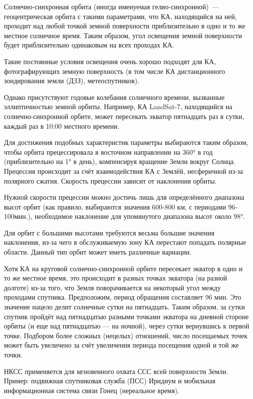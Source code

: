 \documentclass[14pt,a4paper,oneside]{extarticle}
\begin{document}
Солнечно-синхронная орбита (иногда именуемая гелио-синхронной) — геоцентрическая орбита с такими параметрами, что КА, находящийся на ней, проходит над любой точкой земной поверхности приблизительно в одно и то же местное солнечное время. Таким образом, угол освещения земной поверхности будет приблизительно одинаковым на всех проходах КА.

Такие постоянные условия освещения очень хорошо подходят для КА, фотографирующих земную поверхность (в том числе КА дистанционного зондирования земли (ДЗЗ), метеоспутников). 

Однако присутствуют годовые колебания солнечного времени, вызванные эллиптичностью земной орбиты. Например, КА LandSat-7, находящийся на солнечно-синхронной орбите, может пересекать экватор пятнадцать раз в сутки, каждый раз в 10:00 местного времени.

Для достижения подобных характеристик параметры выбираются таким образом, чтобы орбита прецессировала в восточном направлении на 360° в год (приблизительно на 1° в день), компенсируя вращение Земли вокруг Солнца. Прецессия происходит за счёт взаимодействия КА с Землёй, несферичной из-за полярного сжатия. Скорость прецессии зависит от наклонения орбиты.

Нужной скорости прецессии можно достичь лишь для определённого диапазона высот орбит (как правило, выбираются значения 600-800 км, с периодами 96-100мин.), необходимое наклонение для упомянутого диапазона высот около 98°.

Для орбит с большими высотами требуются весьма большие значения наклонения, из-за чего в обслуживаемую зону КА перестают попадать полярные области. Данный тип орбит может иметь различные вариации.

Хотя КА на круговой солнечно-синхронной орбите пересекает экватор в одно и то же местное время, это происходит в разных точках экватора (на разной долготе) из-за того, что Земля поворачивается на некоторый угол между проходами спутника. Предположим, период обращения составляет 96 мин. Это значение нацело делит солнечные сутки на пятнадцать. Таким образом, за сутки спутник пройдёт над пятнадцатью разными точками экватора на дневной стороне орбиты (и еще над пятнадцатью — на ночной), через сутки вернувшись к первой точке. Подбором более сложных (нецелых) отношений, число посещаемых точек может быть увеличено за счёт увеличения периода посещения одной и той же точки.

НКСС применяется для мгновенного охвата ССС всей поверхности Земли. Пример: подвижная спутниковая служба (ПСС) Иридиум и мобильная информационная система связи Гонец (нереальное время).    
\end{document}
